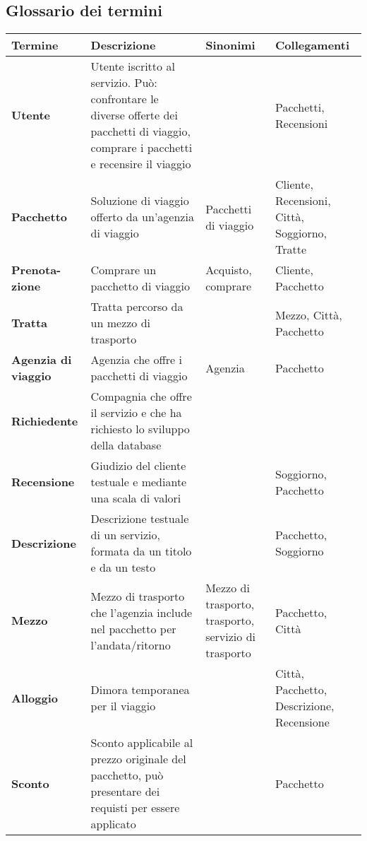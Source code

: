 \subsection{Glossario dei termini}
\begin{tabularx}{\textwidth}{p{} X p{} p{}}
    \toprule
    \textbf{Termine} & \textbf{Descrizione} & \textbf{Sinonimi} & \textbf{Collegamenti} \\
    \midrule
    \textbf{Utente} & Utente iscritto al servizio. Può: confrontare le diverse offerte dei pacchetti di viaggio, comprare i pacchetti e recensire il viaggio & & Pacchetti, Recensioni
    \\\midrule
    \textbf{Pacchetto} & Soluzione di viaggio offerto da un'agenzia di viaggio & Pacchetti di viaggio & Cliente, Recensioni, Città, Soggiorno, Tratte
    \\\midrule
    \textbf{Prenota-zione} & Comprare un pacchetto di viaggio & Acquisto, comprare & Cliente, Pacchetto
    \\\midrule
    \textbf{Tratta} & Tratta percorso da un mezzo di trasporto & & Mezzo, Città, Pacchetto
    \\\midrule
    \textbf{Agenzia di viaggio} & Agenzia che offre i pacchetti di viaggio & Agenzia & Pacchetto
    \\\midrule
    \textbf{Richiedente} & Compagnia che offre il servizio e che ha richiesto lo sviluppo della database & &
    \\\midrule
    \textbf{Recensione} & Giudizio del cliente testuale e mediante una scala di valori & & Soggiorno, Pacchetto
    \\\midrule
    \textbf{Descrizione} & Descrizione testuale di un servizio, formata da un titolo e da un testo & & Pacchetto, Soggiorno
    \\\midrule
    \textbf{Mezzo} & Mezzo di trasporto che l'agenzia include nel pacchetto per l'andata/ritorno & Mezzo di trasporto, trasporto, servizio di trasporto & Pacchetto, Città
    \\\midrule
    \textbf{Alloggio} & Dimora temporanea per il viaggio & & Città, Pacchetto, Descrizione, Recensione
    \\\midrule
    \textbf{Sconto} & Sconto applicabile al prezzo originale del pacchetto, può presentare dei requisti per essere applicato & & Pacchetto
    \\
    \bottomrule
\end{tabularx}


